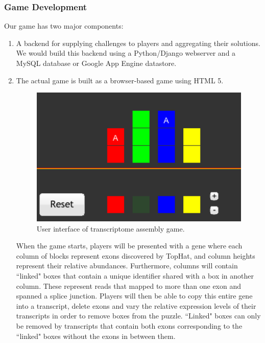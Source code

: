 \documentclass[12pt]{article}
\begin{document}
\subsubsection*{Game Development}
Our game has two major components:
\begin{enumerate}
\item A backend for supplying challenges to players and aggregating their solutions. We would build this backend using a Python/Django webserver and a MySQL database or Google App Engine datastore.
\item The actual game is built as a browser-based game using HTML 5.

\begin{figure}[H]
\includegraphics[scale=0.5]{gameshot.png}
\caption{User interface of transcriptome assembly game.}
\centering
\label{fig:proposedui}
\end{figure}

When the game starts, players will be presented with a gene where each column of blocks represent exons discovered by TopHat, and column heights represent their relative abundances. Furthermore, columns will contain ``linked" boxes that contain a unique identifier shared with a box in another column.
These represent reads that mapped to more than one exon and spanned a splice junction. Players will then be able to copy this entire gene into a transcript, delete exons and vary the relative expression levels of their transcripts in order to remove boxes from the puzzle. ``Linked" boxes can only be removed by
transcripts that contain both exons corresponding to the ``linked" boxes without the exons in between them.


\end{enumerate}
\end{document}
